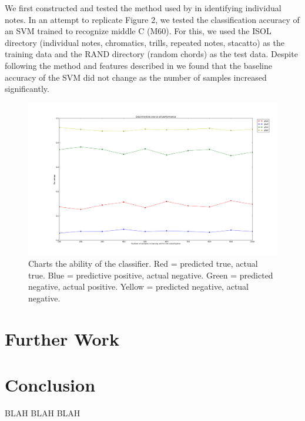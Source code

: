 \documentclass{article}
\begin{document}
We first constructed and tested the method used by \cite{poliner2006discriminative} in identifying individual notes. In an attempt to replicate Figure 2, we tested the classification accuracy of an SVM trained to recognize middle C (M60). For this, we used the ISOL directory (individual notes, chromatics, trills, repeated notes, stacatto) as the training data and the RAND directory (random chords) as the test data. Despite following the method and features described in \cite{poliner2006discriminative} we found that the baseline accuracy of the SVM did not change as the number of samples increased significantly.

\begin{figure}
\includegraphics[scale=.15]{discriminitive.png}
\caption{Charts the ability of the classifier. Red = predicted true, actual true. Blue = predictive positive, actual negative. Green = predicted negative, actual positive. Yellow = predicted negative, actual negative.} 
\end{figure}


\section{Further Work}


\section{Conclusion}

BLAH BLAH BLAH

\end{document}
